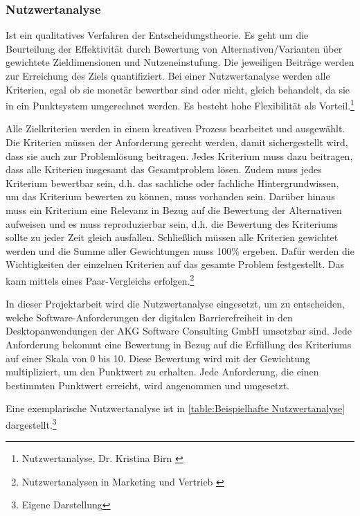 \subsubsection{Nutzwertanalyse}

Ist ein qualitatives Verfahren der Entscheidungstheorie. Es geht um die Beurteilung der Effektivität durch Bewertung von Alternativen/Varianten über gewichtete Zieldimensionen und Nutzeneinstufung. Die jeweiligen Beiträge werden zur Erreichung des Ziels quantifiziert. Bei einer Nutzwertanalyse werden alle Kriterien, egal ob sie monetär bewertbar sind oder nicht, gleich behandelt, da sie in ein Punktsystem umgerechnet werden. Es besteht hohe Flexibilität als Vorteil.\footnote{Nutzwertanalyse, Dr. Kristina Birn \cite{Dr.KB-Projektmanagment}}

Alle Zielkriterien werden in einem kreativen Prozess bearbeitet und ausgewählt. Die Kriterien müssen der Anforderung gerecht werden, damit sichergestellt wird, dass sie auch zur Problemlösung beitragen. Jedes Kriterium muss dazu beitragen, dass alle Kriterien insgesamt das Gesamtproblem lösen. Zudem muss jedes Kriterium bewertbar sein, d.h. das sachliche oder fachliche Hintergrundwissen, um das Kriterium bewerten zu können, muss vorhanden sein. Darüber hinaus muss ein Kriterium eine Relevanz in Bezug auf die Bewertung der Alternativen aufweisen und es muss reproduzierbar sein, d.h. die Bewertung des Kriteriums sollte zu jeder Zeit gleich ausfallen. Schließlich müssen alle Kriterien gewichtet werden und die Summe aller Gewichtungen muss 100\% ergeben. Dafür werden die Wichtigkeiten der einzelnen Kriterien auf das gesamte Problem festgestellt. Das kann mittels eines Paar-Vergleichs erfolgen.\footnote{Nutzwertanalysen in Marketing und Vertrieb \cite{kuhnapfel2014nutzwertanalysen}}

In dieser Projektarbeit wird die Nutzwertanalyse eingesetzt, um zu entscheiden, welche Software-Anforderungen der digitalen Barrierefreiheit in den Desktopanwendungen der AKG Software Consulting GmbH umsetzbar sind. Jede Anforderung bekommt eine Bewertung in Bezug auf die Erfüllung des Kriteriums auf einer Skala von 0 bis 10. Diese Bewertung wird mit der Gewichtung multipliziert, um den Punktwert zu erhalten. Jede Anforderung, die einen bestimmten Punktwert erreicht, wird angenommen und umgesetzt. 

Eine exemplarische Nutzwertanalyse ist in \cref{table:Beispielhafte Nutzwertanalyse} dargestellt.\footnote{Eigene Darstellung}

